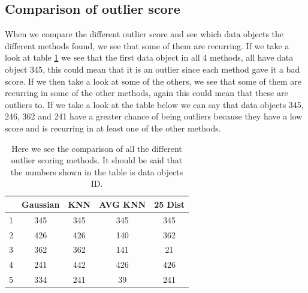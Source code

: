 \subsection{Comparison of outlier score}

When we compare the different outlier score and see which data objects the different methods found, we see that some of them are recurring. If we take a look at table \ref{compare} we see that the first data object in all 4 methods, all have data object 345, this could mean that it is an outlier since each method gave it a bad score. If we then take a look at some of the others, we see that some of them are recurring in some of the other methods, again this could mean that these are outliers to. If we take a look at the table below we can say that data objects 345, 246, 362 and 241 have a greater chance of being outliers because they have a low score and is recurring in at least one of the other methods.
\begin{table}[H]
\begin{longtable}{lcccc}
\hline
  & Gaussian & KNN & AVG KNN & 25 Dist \\ \hline
1 & 345      & 345 & 345     & 345 \\ 
2 & 426      & 426 & 140     & 362 \\ 
3 & 362      & 362 & 141     & 21 \\ 
4 & 241      & 442 & 426     & 426 \\ 
5 & 334      & 241 & 39      & 241 \\ \hline
\end{longtable}
\label{compare}
\caption{\footnotesize Here we see the comparison of all the different outlier scoring methods. It should be said that the numbers shown in the table is data objects ID.}
\end{table}